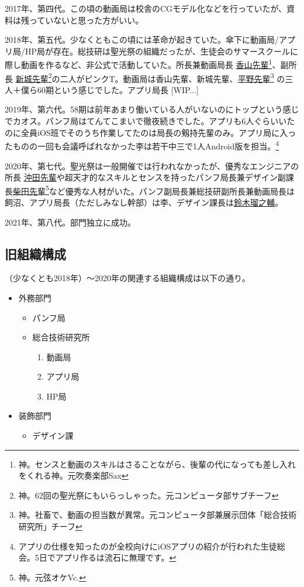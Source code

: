 \documentclass[dvipdfmx,jb5]{jreport}
\newcommand{\mail}[2]{\href{mailto:#2}{#1}}
\begin{document}
2017年、第四代。この頃の動画局は校舎のCGモデル化などを行っていたが、資料は残っていないと思った方がいい。

2018年、第五代。少なくともこの頃には革命が起きていた。傘下に動画局/アプリ局/HP局が存在。総技研は聖光祭の組織だったが、生徒会のサマースクールに際し動画を作るなど、非公式で活動していた。所長兼動画局長 \mail{香山先輩}{57084koyama@seiko.ac.jp}\footnote{神。センスと動画のスキルはさることながら、後輩の代になっても差し入れをくれる神。元吹奏楽部Sax}、副所長 \mail{新城先輩}{57011araki@seiko.ac.jp}\footnote{神。62回の聖光祭にもいらっしゃった。元コンピュータ部サブチーフ}の二人がピンクT。動画局は香山先輩、新城先輩、\mail{平野先輩}{57174hirano@seiko.ac.jp}\footnote{ 神。社畜で、動画の担当数が異常。元コンピュータ部兼展示団体「総合技術研究所」チーフ} の三人＋僕ら60期という感じでした。アプリ局長 [WIP...]

2019年、第六代。58期は前年あまり働いている人がいないのにトップという感じでカオス。パンフ局はてんてこまいで徹夜続きでした。アプリも6人ぐらいいたのに全員iOS班でそのうち作業してたのは局長の剱持先輩のみ。アプリ局に入ったものの一回も会議呼ばれなかった李は若干中三で1人Android版を担当。\footnote{アプリの仕様を知ったのが全校向けにiOSアプリの紹介が行われた生徒総会。5日でアプリ作るは流石に無理です。}

2020年、第七代。聖光祭は一般開催では行われなかったが、優秀なエンジニアの所長 \mail{沖田先輩}{59039okita@seiko.ac.jp}や超天才的なスキルとセンスを持ったパンフ局長兼デザイン副課長\mail{柴田先輩}{59091shibataseiko.ac.jp}\footnote{神。元弦オケVc.}など優秀な人材がいた。パンフ副局長兼総技研副所長兼動画局長は飼沼、アプリ局長（ただしみなし幹部）は李、デザイン課長は\mail{鈴木瑠之輔}{60111suzuki@seiko.ac.jp}。

2021年、第八代。部門独立に成功。

\subsection{旧組織構成}
（少なくとも2018年）〜2020年の関連する組織構成は以下の通り。
\begin{itemize}
      \item 外務部門
            \begin{itemize}
                  \item パンフ局
                  \item 総合技術研究所
                        \begin{enumerate}[−]
                              \item 動画局
                              \item アプリ局
                              \item HP局
                        \end{enumerate}
            \end{itemize}
      \item 装飾部門
            \begin{itemize}
                  \item デザイン課
            \end{itemize}
\end{itemize}
\end{document}
